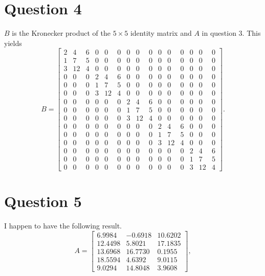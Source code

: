 \documentclass[12pt]{article}
\begin{document}
\section{Question 4}
$B$ is the Kronecker product of the $5\times 5$ identity matrix and $A$ in question 3. This yields
$$
B=\left[
\begin{array}{ccccccccccccccc}
     2   &  4 &    6 &    0 &    0 &    0  &   0 &    0 &    0 &    0 &    0 &    0 &    0 &    0 &    0\\
     1  &   7 &    5 &    0 &    0 &    0 &    0 &    0 &    0 &    0 &    0 &    0 &    0 &    0 &    0\\
     3 &   12&     4   &  0   &  0  &   0  &   0  &   0 &    0 &    0 &    0 &    0 &    0  &   0  &   0\\
     0 &    0  &   0   &  2   &  4 &    6&     0 &    0    & 0 &    0  &   0   &  0     &0  &   0 &    0\\
     0   &  0   &  0  &   1 &    7   &  5  &   0   &  0 &    0   &  0&     0  &   0 &    0 &    0&     0\\
     0  &   0 &    0  &   3   & 12    & 4   &  0 &    0 &    0 &    0  &   0  &   0    & 0  &   0  &   0\\
     0  &   0 &    0&     0&     0&     0&     2&     4&     6&     0&     0&     0&     0&     0&     0\\
     0   &  0  &   0 &    0 &    0&     0&     1&     7&     5&     0&     0 &    0&     0&     0&     0\\
     0    & 0   &  0  &   0  &   0&     0&     3&    12&     4&     0&     0&     0&     0&     0&     0\\
     0   &  0  &   0   &  0   &  0 &    0&     0&     0 &    0 &    2&     4&     6 &    0 &    0 &    0\\
     0    & 0   &  0    & 0&     0  &   0 &    0 &    0 &    0&     1 &    7 &    5 &    0 &    0  &   0\\
     0  &   0   &  0&     0 &    0   &  0  &   0  &   0 &    0 &    3  &  12 &    4&     0&     0  &   0\\
     0   &  0   &  0 &    0  &   0   &  0   &  0   &  0 &    0 &    0   &  0   &  0 &    2 &    4  &   6\\
     0    & 0   &  0 &    0   &  0   &  0     &0    & 0 &    0 &    0    & 0    & 0 &    1 &    7  &   5\\
    0 &0 &0 &0& 0& 0& 0& 0& 0& 0& 0& 0& 3& 12& 4
\end{array}
\right].
$$

\section{Question 5}
I happen to have the following result.
$$
A=\left[
\begin{array}{rrr}
    6.9984&   -0.6918&   10.6202\\
   12.4498&    5.8021 &  17.1835\\
   13.6968 &  16.7730&    0.1955\\
   18.5594  &  4.6392  &  9.0115\\
9.0294& 14.8048& 3.9608
\end{array}
\right],
$$
\end{document}
